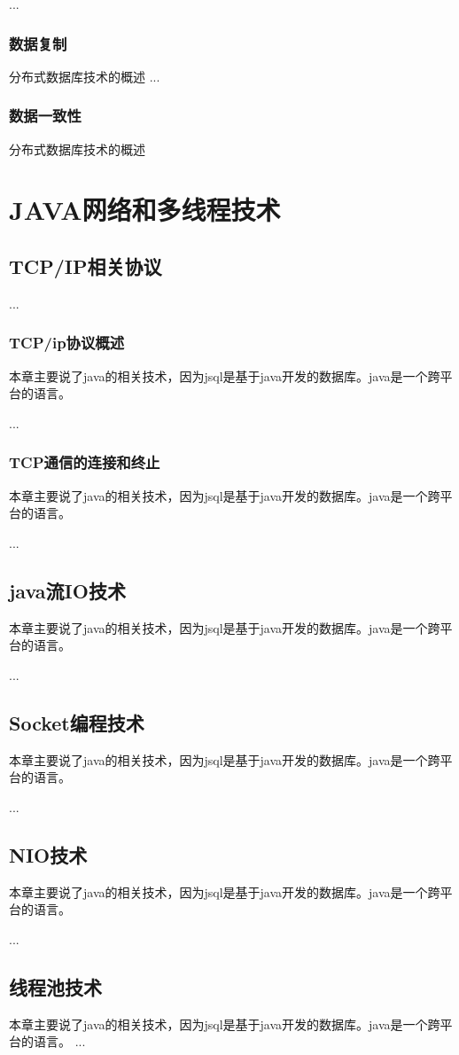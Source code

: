 ...
\subsubsection*{数据复制}
分布式数据库技术的概述
...
\subsubsection*{数据一致性}
分布式数据库技术的概述
\section{JAVA网络和多线程技术}
\subsection{TCP/IP相关协议}
...
\subsubsection*{TCP/ip协议概述}
本章主要说了java的相关技术，因为jsql是基于java开发的数据库。java是一个跨平台的语言。

...
\subsubsection*{TCP通信的连接和终止}
本章主要说了java的相关技术，因为jsql是基于java开发的数据库。java是一个跨平台的语言。

...
\subsection{java流IO技术}
本章主要说了java的相关技术，因为jsql是基于java开发的数据库。java是一个跨平台的语言。

...
\subsection{Socket编程技术}
本章主要说了java的相关技术，因为jsql是基于java开发的数据库。java是一个跨平台的语言。

...
\subsection{NIO技术}
本章主要说了java的相关技术，因为jsql是基于java开发的数据库。java是一个跨平台的语言。

...
\subsection{线程池技术}
本章主要说了java的相关技术，因为jsql是基于java开发的数据库。java是一个跨平台的语言。
...
